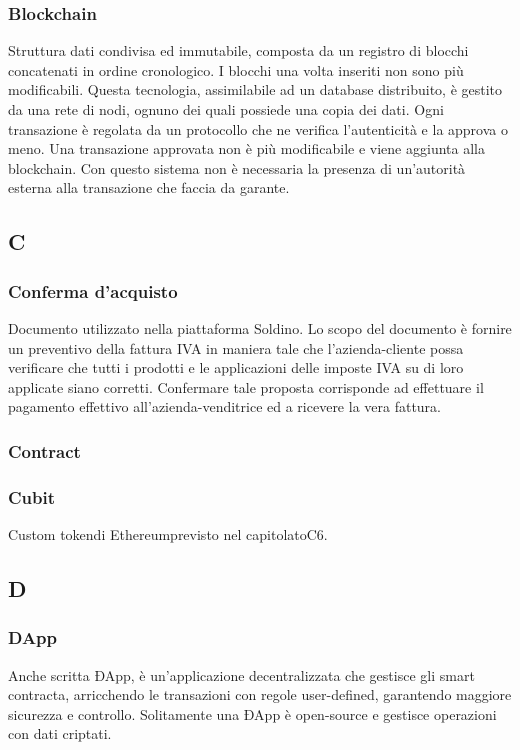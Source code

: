 \subsubsection*{Blockchain}
Struttura dati condivisa ed immutabile, composta da un registro di blocchi concatenati in ordine cronologico. I blocchi una volta inseriti non sono più modificabili. Questa tecnologia, assimilabile ad un database distribuito, è gestito da una rete di nodi, ognuno dei quali possiede una copia dei dati.  Ogni transazione è regolata da un protocollo che ne verifica l'autenticità e la approva o meno. Una transazione approvata non è più modificabile e viene aggiunta alla blockchain. Con questo sistema non è necessaria la presenza di un'autorità esterna alla transazione che faccia da garante.


\subsection*{C}


\subsubsection*{Conferma d'acquisto}
Documento utilizzato nella piattaforma Soldino. Lo scopo del documento è fornire un preventivo della fattura IVA in maniera tale che l'azienda-cliente possa verificare che tutti i prodotti e le applicazioni delle imposte IVA su di loro applicate siano corretti. Confermare tale proposta corrisponde ad effettuare il pagamento effettivo all'azienda-venditrice ed a ricevere la vera fattura.


\subsubsection*{Contract}


\subsubsection*{Cubit}
Custom token\glosp di Ethereum\glosp previsto nel capitolato\glosp C6.

\subsection*{D}

\subsubsection*{DApp}
Anche scritta ÐApp, è un'applicazione decentralizzata che gestisce gli smart contracta\glo, arricchendo le transazioni con regole user-defined, garantendo maggiore sicurezza e controllo. Solitamente una ÐApp è open-source e  gestisce operazioni con dati criptati.

